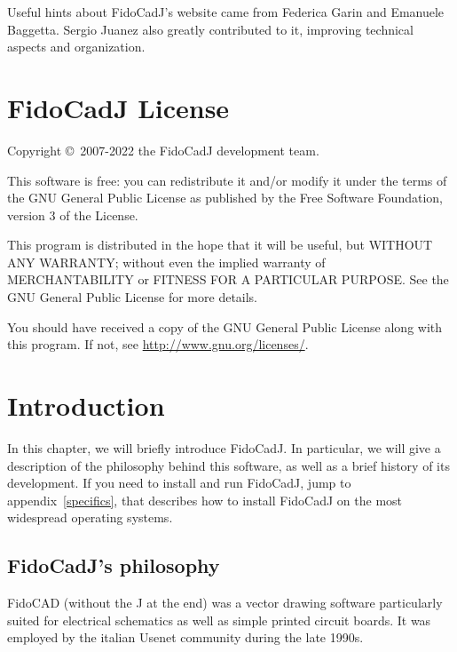 \documentclass[10pt,a4paper,twoside]{scrreprt}
\begin{document}
Useful hints about FidoCadJ's website came from Federica Garin and Emanuele Baggetta. Sergio Juanez also greatly contributed to it, improving technical aspects and organization.

\chapter*{
FidoCadJ License}

Copyright \copyright\ 2007-2022 the FidoCadJ development team.

This software is free: you can redistribute it and/or modify it under
the terms of the GNU General Public License as published by the Free
Software Foundation, version 3 of the License.

This program is distributed in the hope that it will be useful, but
WITHOUT ANY WARRANTY; without even the implied warranty of MERCHANTABILITY
or FITNESS FOR A PARTICULAR PURPOSE. See the GNU General Public License
for more details.

You should have received a copy of the GNU General Public License
along with this program. If not, see \href{http://www.gnu.org/licenses/}{http://www.gnu.org/licenses/}.

\tableofcontents
{}

\listoffigures
{}

\begingroup
\let\clearpage\relax
\let\cleardoublepage\relax
\let\cleardoublepage\relax
\listoftables
{}

\endgroup

\chapter{Introduction}  In this chapter,
we will briefly introduce FidoCadJ. In particular, we will give a
description of the philosophy behind this software, as well as a brief
history of its development.
If you need to install and run FidoCadJ, jump to appendix~\ref{specifics}, that   describes how to install FidoCadJ on the most widespread operating systems.

\section{FidoCadJ's philosophy}

FidoCAD (without the J at the end) was a vector
drawing software particularly suited for electrical schematics as well
as simple printed circuit boards. It was employed by the italian Usenet community during the late 1990s.
\end{document}
